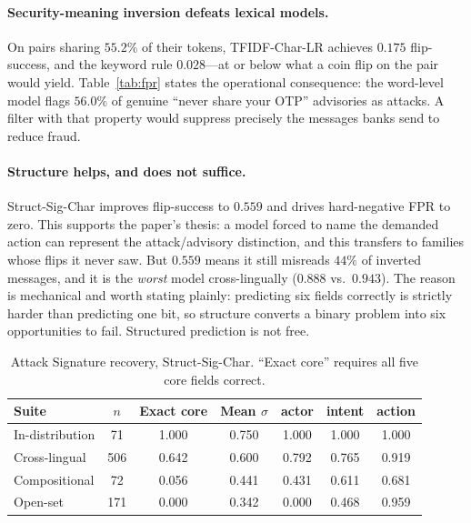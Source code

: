 \documentclass[11pt,a4paper]{article}
\newcommand{\sig}{\ensuremath{\sigma}}
\begin{document}
\paragraph{Security-meaning inversion defeats lexical models.}
On pairs sharing $55.2\%$ of their tokens, TFIDF-Char-LR achieves $0.175$
flip-success, and the keyword rule $0.028$---at or below what a coin flip on the
pair would yield. Table~\ref{tab:fpr} states the operational consequence: the
word-level model flags $56.0\%$ of genuine ``never share your OTP'' advisories as
attacks. A filter with that property would suppress precisely the messages banks
send to reduce fraud.

\paragraph{Structure helps, and does not suffice.}
Struct-Sig-Char improves flip-success to $0.559$ and drives hard-negative FPR to
zero. This supports the paper's thesis: a model forced to name the demanded
action can represent the attack/advisory distinction, and this transfers to
families whose flips it never saw. But $0.559$ means it still misreads $44\%$ of
inverted messages, and it is the \emph{worst} model cross-lingually
($0.888$ vs.\ $0.943$). The reason is mechanical and worth stating plainly:
predicting six fields correctly is strictly harder than predicting one bit, so
structure converts a binary problem into six opportunities to fail. Structured
prediction is not free.

\begin{table}[t]
\centering\small
\caption{Attack Signature recovery, Struct-Sig-Char. ``Exact core'' requires all
five core fields correct.}
\label{tab:sigrec}
\begin{tabular}{@{}lcccccc@{}}
\toprule
\textbf{Suite} & $n$ & \textbf{Exact core} & \textbf{Mean \sig} &
\textbf{actor} & \textbf{intent} & \textbf{action} \\
\midrule
In-distribution & 71  & 1.000 & 0.750 & 1.000 & 1.000 & 1.000 \\
Cross-lingual   & 506 & 0.642 & 0.600 & 0.792 & 0.765 & 0.919 \\
Compositional   & 72  & 0.056 & 0.441 & 0.431 & 0.611 & 0.681 \\
Open-set        & 171 & 0.000 & 0.342 & 0.000 & 0.468 & 0.959 \\
\bottomrule
\end{tabular}
\end{table}
\end{document}
